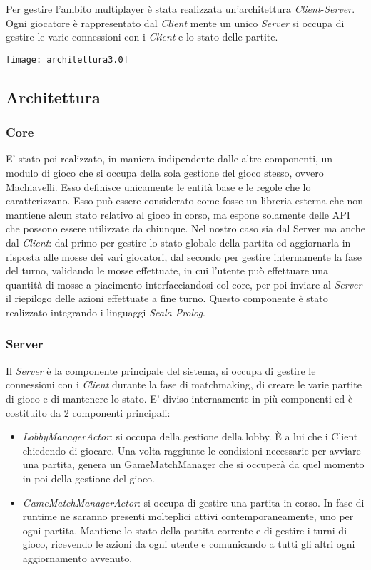 Per gestire l'ambito multiplayer è stata realizzata un’architettura \textit{Client}-\textit{Server}.
Ogni giocatore è rappresentato dal \textit{Client} mente un unico \textit{Server} si occupa di gestire le varie connessioni con i \textit{Client} e lo stato delle partite.
\begin{center}
    \texttt{[image: architettura3.0]}
\end{center}
\subsection[Architettura]{Architettura}
\subsubsection{Core}
E’ stato poi realizzato, in maniera indipendente dalle altre componenti, un modulo di gioco che si occupa della sola gestione del gioco stesso, ovvero Machiavelli.
Esso definisce unicamente le entità base e le regole che lo caratterizzano.
Esso può essere considerato come fosse un libreria esterna che non mantiene alcun stato relativo al gioco in corso, ma espone solamente delle API che possono essere utilizzate da chiunque.
Nel nostro caso sia dal Server ma anche dal \textit{Client}: dal primo per gestire lo stato globale della partita ed aggiornarla in risposta alle mosse dei vari giocatori, dal secondo per gestire internamente la fase del turno, validando le mosse effettuate, in cui l’utente può effettuare una quantità di mosse a piacimento interfacciandosi col core, per poi inviare al \textit{Server} il riepilogo delle azioni effettuate a fine turno.
Questo componente è stato realizzato integrando i linguaggi \textit{Scala-Prolog}.
\subsubsection{Server}
Il \textit{Server} è la componente principale del sistema, si occupa di gestire le connessioni con i \textit{Client} durante la fase di matchmaking, di creare le varie partite di gioco e di mantenere lo stato.
E’ diviso internamente in più componenti ed è costituito da 2 componenti principali:
\begin{itemize}
    \item \textit{LobbyManagerActor}: si occupa della gestione della lobby.
    È a lui che i Client chiedendo di giocare.
    Una volta raggiunte le condizioni necessarie per avviare una partita, genera un GameMatchManager che si occuperà da quel momento in poi della gestione del gioco.
    \item \textit{GameMatchManagerActor}: si occupa di gestire una partita in corso.
    In fase di runtime ne saranno presenti molteplici attivi contemporaneamente, uno per ogni partita.
    Mantiene lo stato della partita corrente e di gestire i turni di gioco, ricevendo le azioni da ogni utente e comunicando a tutti gli altri ogni aggiornamento avvenuto.
\end{itemize}
